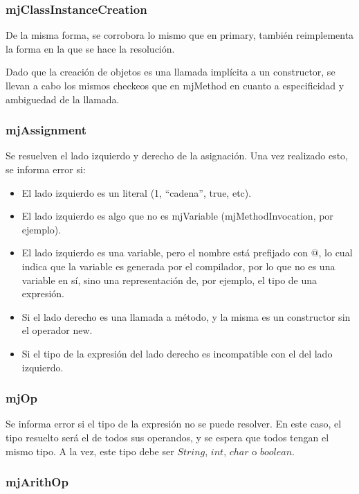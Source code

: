 \documentclass [a4paper,abstracton,titlepage]{scrartcl}
\begin{document}
  \subsubsection{mjClassInstanceCreation}

De la misma forma, se corrobora lo mismo que en primary, también reimplementa
la forma en la que se hace la resolución.

Dado que la creación de objetos es una llamada implícita a un constructor, se llevan a cabo los mismos checkeos que en mjMethod en cuanto a especificidad y ambiguedad de la llamada.

  \subsubsection{mjAssignment}

Se resuelven el lado izquierdo y derecho de la asignación. Una vez realizado
esto, se informa error si:

  \begin{itemize}
   \item El lado izquierdo es un literal (1, ``cadena'', true, etc).
   \item El lado izquierdo es algo que no es mjVariable (mjMethodInvocation,
por ejemplo).
   \item El lado izquierdo es una variable, pero el nombre está prefijado con
$@$, lo cual indica que la variable es generada por el compilador, por lo que
no es una variable en sí, sino una representación de, por ejemplo, el tipo de
una expresión.
   \item Si el lado derecho es una llamada a método, y la misma es un
constructor sin el operador new.
   \item Si el tipo de la expresión del lado derecho es incompatible con el del
lado izquierdo.
  \end{itemize}

  \subsubsection{mjOp}

Se informa error si el tipo de la expresión no se puede resolver. En este caso,
el tipo resuelto será el de todos sus operandos, y se espera que todos tengan
el mismo tipo. A la vez, este tipo debe ser $String$, $int$, $char$ o $boolean$.

  \subsubsection{mjArithOp}
\end{document}
